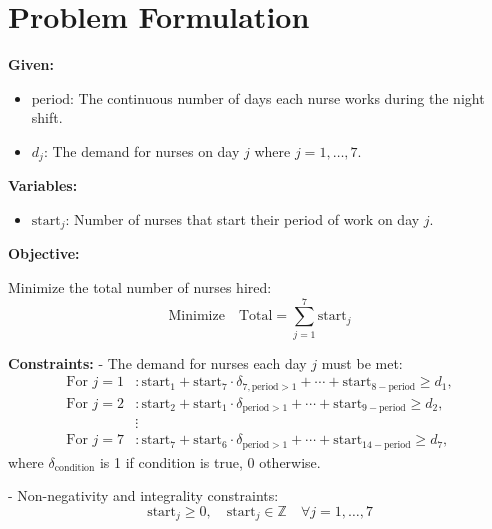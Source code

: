 \documentclass{article}
\begin{document}
\section*{Problem Formulation}

\textbf{Given:}
\begin{itemize}
    \item \( \text{period} \): The continuous number of days each nurse works during the night shift.
    \item \( d_j \): The demand for nurses on day \( j \) where \( j = 1, \ldots, 7 \).
\end{itemize}

\textbf{Variables:}
\begin{itemize}
    \item \( \text{start}_j \): Number of nurses that start their period of work on day \( j \).
\end{itemize}

\textbf{Objective:}

Minimize the total number of nurses hired:
\[
\text{Minimize} \quad \text{Total} = \sum_{j=1}^{7} \text{start}_j
\]

\textbf{Constraints:}
- The demand for nurses each day \( j \) must be met:
  \[
  \begin{align*}
    \text{For } j = 1 &: \text{start}_1 + \text{start}_7 \cdot \delta_{7,\text{period}>1} + \cdots + \text{start}_{8-\text{period}} \geq d_1, \\
    \text{For } j = 2 &: \text{start}_2 + \text{start}_1 \cdot \delta_{\text{period}>1} + \cdots + \text{start}_{9-\text{period}} \geq d_2, \\
    &\vdots \\
    \text{For } j = 7 &: \text{start}_7 + \text{start}_6 \cdot \delta_{\text{period}>1} + \cdots + \text{start}_{14-\text{period}} \geq d_7,
  \end{align*}
  \]
  where \( \delta_{\text{condition}} \) is 1 if condition is true, 0 otherwise.

- Non-negativity and integrality constraints:
  \[
  \text{start}_j \geq 0, \quad \text{start}_j \in \mathbb{Z} \quad \forall j = 1, \ldots, 7
  \]
\end{document}
